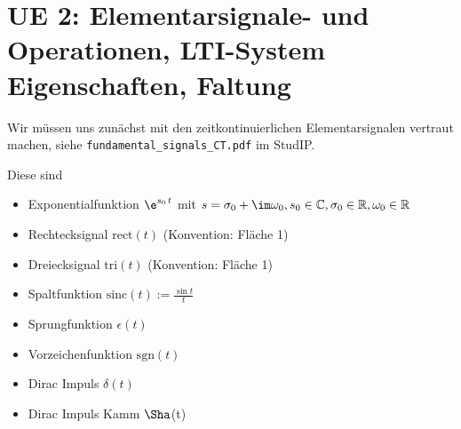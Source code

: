 \newpage
\section{UE 2: Elementarsignale- und Operationen, LTI-System Eigenschaften, Faltung}
\label{sec:ue2_faltung}

Wir müssen uns zunächst mit den zeitkontinuierlichen Elementarsignalen vertraut
machen, siehe \verb|fundamental_signals_CT.pdf| im StudIP.

Diese sind
\begin{itemize}
  \item Exponentialfunktion
  $\e^{s_0 \, t}$ mit $s=\sigma_0 + \im\omega_0, s_0\in\mathbb{C}, \sigma_0\in\mathbb{R}, \omega_0\in\mathbb{R}$
  \item Rechtecksignal $\mathrm{rect}(t)$ (Konvention: Fläche 1)
  \item Dreiecksignal $\mathrm{tri}(t)$  (Konvention: Fläche 1)
  \item Spaltfunktion $\mathrm{sinc}(t):=\frac{\sin t}{t}$
  \item Sprungfunktion $\epsilon(t)$
  \item Vorzeichenfunktion $\mathrm{sgn}(t)$
  \item Dirac Impuls $\delta(t)$
  \item Dirac Impuls Kamm $\Sha$(t)
\end{itemize}








\newpage
